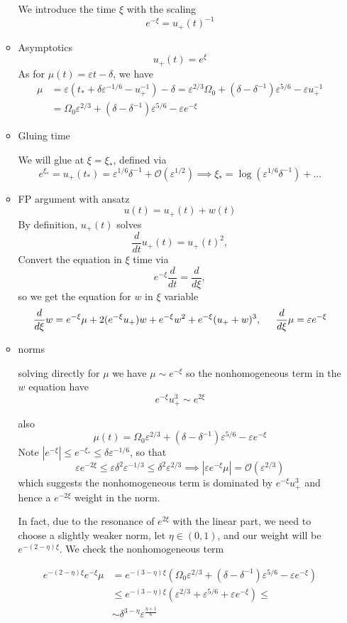 \documentclass[letterpaper,11pt]{article}
\newcommand{\rmO}{\mathcal{O}}
\newcommand{\eps}{\varepsilon}
\numberwithin{equation}{section}
\theoremstyle{plain}
\begin{document}
\begin{enumerate}
\begin{itemize}
We introduce the time $\xi$ with the scaling
\[
e^{-\xi} = u_+(t)^{-1}
\]
\item Asymptotics
\begin{equation*}
u_+(t) =e^\xi
\end{equation*}
As for $\mu(t) = \eps t -\delta$, we have
\begin{align*}
\mu &= \eps(t_*+\delta\eps^{-1/6}-u_+^{-1}) -\delta = \eps^{2/3}\Omega_0 +(\delta-\delta^{-1})\eps^{5/6} -\eps u_+^{-1}\\
&=\Omega_0\eps^{2/3} +(\delta-\delta^{-1})\eps^{5/6}-\eps e^{-\xi}
\end{align*}


\item Gluing time


We will glue at $\xi = \xi_*$, defined via
\[
e^{\xi_*} = u_+(t_*) = \eps^{1/6}\delta^{-1} +\rmO(\eps^{1/2})\implies \xi_* = \log (\eps^{1/6}\delta^{-1})+...
\]

\item FP argument with ansatz
\[
u(t) = u_+(t) +w(t)
\]
By definition, $u_+(t)$ solves 
\[
\frac{d}{dt} u_+(t) = u_+(t)^2,
\]
Convert the equation in $\xi$ time via 
\[
e^{-\xi}\frac{d}{dt}  = \frac{d}{d\xi},
\]
so we get the equation for $w$ in $\xi$ variable
\[
\frac{d}{d\xi} w = e^{-\xi}\mu +2(e^{-\xi}u_+) w +e^{-\xi}w^2+e^{-\xi}(u_++w)^3, \hspace{0.2in} \frac{d}{d\xi} \mu = \eps e^{-\xi}
\]

\item norms

solving directly for $\mu$ we have $\mu \sim e^{-\xi}$ so the nonhomogeneous term in the $w$ equation have
\[ 
e^{-\xi}u_+^3 \sim e^{2\xi}
\]

also
\[
\mu(t)=\Omega_0\eps^{2/3} +(\delta-\delta^{-1})\eps^{5/6}-\eps e^{-\xi}
\]
Note $|e^{-\xi} | \le e^{-\xi_*} \le \delta \eps^{-1/6}$, so that
\[
\eps e^{-2\xi} \le \eps\delta^2\eps^{-1/3} \le \delta^2\eps^{2/3}  \implies |\eps e^{-\xi}\mu| =\rmO(\eps^{2/3})
\]
which suggests the nonhomogeneous term is dominated by $e^{-\xi}u_+^3$ and hence a $e^{-2\xi}$ weight in the norm.

In fact, due to the resonance of $e^{2\xi}$ with the linear part, we need to choose a slightly weaker norm, let $\eta \in (0,1)$, and our weight will be $e^{-(2-\eta)\xi}$.
We check the nonhomogeneous term

\begin{align*}
e^{-(2-\eta)\xi} e^{-\xi}\mu &=e^{-(3-\eta)\xi} (\Omega_0 \eps^{2/3} + (\delta-\delta^{-1})\eps^{5/6}-\eps e^{-\xi} )\\
& \le e^{-(3-\eta)\xi} (\eps^{2/3}+\eps^{5/6}+\eps e^{-\xi}) \le  \\
&\sim \delta^{3-\eta}\eps^{\frac{\eta+1}{6}}
\end{align*}



\end{itemize}
\end{enumerate}
\end{document}
